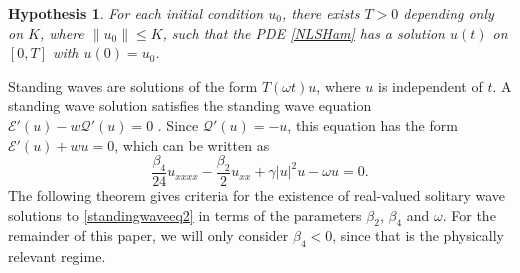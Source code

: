 \documentclass[12pt]{elsarticle}
\def\calE{{\mathcal E}}
\def\calQ{{\mathcal Q}}
\newtheorem{hypothesis}{Hypothesis}
\begin{document}
\begin{hypothesis}\label{hyp:wp}
For each initial condition $u_0$, there exists $T > 0$ depending only on $K$, where $\|u_0\| \leq K$, such that the PDE \cref{NLSHam} has a solution $u(t)$ on $[0, T]$ with $u(0) = u_0$.
\end{hypothesis}

Standing waves are solutions of the form $T(\omega t) u$, where $u$ is independent of $t$. A standing wave solution satisfies the standing wave equation $\calE'(u) - w \calQ'(u) = 0$ \cite[2.15]{Grillakis1987}. Since $\calQ'(u) = -u$, this equation has the form $\calE'(u) + w u = 0$, which can be written as
\begin{equation}\label{standingwaveeq2}
\frac{\beta_4}{24}u_{xxxx} - \frac{\beta_2}{2}u_{xx} + \gamma |u|^2 u - \omega u = 0.
\end{equation}
The following theorem gives criteria for the existence of real-valued solitary wave solutions to \cref{standingwaveeq2} in terms of the parameters $\beta_2$, $\beta_4$ and $\omega$. For the remainder of this paper, we will only consider $\beta_4 < 0$, since that is the physically relevant regime.
\end{document}
